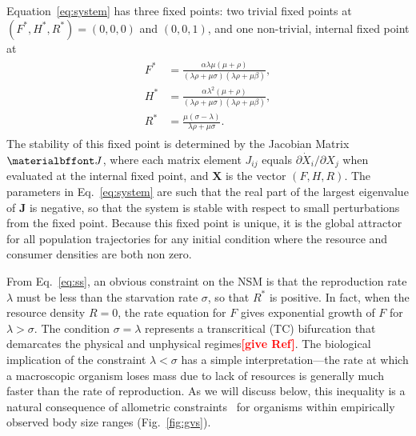 \documentclass{pnastwo}
\newcommand{\sid}[1]{\textcolor{red}{\bf [#1]}}
\begin{document}
\begin{article}
Equation~\eqref{eq:system} has three fixed points: two trivial fixed points
at $(F^*,H^*,R^*)=(0,0,0)$ and $(0,0,1)$, and one non-trivial, internal
fixed point at
\begin{eqnarray}
\label{eq:ss}
\begin{split}
F^* &= \frac{\alpha  \lambda  \mu  (\mu +\rho )}{(\lambda  \rho +\mu  \sigma ) (\lambda  \rho +\mu  \beta)}, \\
H^* &= \frac{\alpha  \lambda ^2 (\mu +\rho )}{(\lambda  \rho +\mu  \sigma ) (\lambda  \rho +\mu  \beta)}, \\
R^* &= \frac{\mu  (\sigma -\lambda )}{\lambda  \rho +\mu  \sigma }.
\end{split}
\end{eqnarray}
The stability of this fixed point is determined by the Jacobian Matrix
$\bf J$, where each matrix element $J_{ij}$ equals
$\partial{\dot X_i}/\partial{X_j}$ when evaluated at the internal fixed
point, and $\mathbf{X}$ is the vector $(F,H,R)$.  The parameters in
Eq.~\eqref{eq:system} are such that the real part of the largest eigenvalue
of $\mathbf{J}$ is negative, so that the system is stable with respect to
small perturbations from the fixed point.  Because this fixed point is
unique, it is the global attractor for all population trajectories for any
initial condition where the resource and consumer densities are both non
zero.

From Eq.~\eqref{eq:ss}, an obvious constraint on the NSM is that the
reproduction rate $\lambda$ must be less than the starvation rate $\sigma$,
so that $R^*$ is positive.  In fact, when the resource density $R=0$, the
rate equation for $F$ gives exponential growth of $F$ for $\lambda>\sigma$.
The condition $\sigma = \lambda$ represents a transcritical (TC) bifurcation
that demarcates the physical and unphysical regimes\sid{give Ref}.  The
biological implication of the constraint $\lambda<\sigma$ has a simple
interpretation---the rate at which a macroscopic organism loses mass due to
lack of resources is generally much faster than the rate of reproduction.  As
we will discuss below, this inequality is a natural consequence of allometric
constraints~\cite{Kempes:2012hy} for organisms within empirically observed
body size ranges (Fig.~\ref{fig:gvs}).


\end{article}
\end{document}
